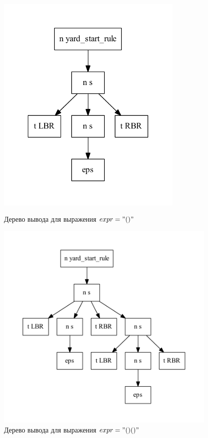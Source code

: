 \begin{figure}[!h]
\centering
\begin{minipage}[b]{0.49\linewidth}
 \includegraphics[width=0.8\textwidth]{pics/sppf1.pdf}
 \caption{Дерево вывода для выражения $expr="()"$}
 \label{sppf1}
\end{minipage}
\begin{minipage}[b]{0.49\linewidth}
  \includegraphics[width=0.95\textwidth]{pics/sppf2.pdf}
  \caption{Дерево вывода для выражения $expr="()()"$}
  \label{sppf2}
\end{minipage}%
\end{figure}

